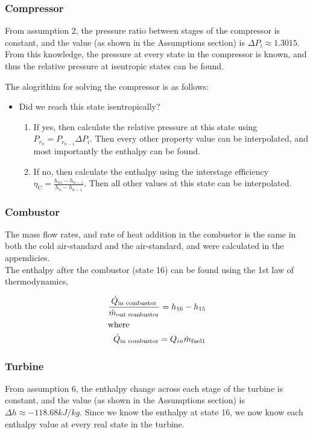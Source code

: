 \documentclass[11pt]{article} %
\begin{document}
\subsubsection*{Compressor}
From assumption 2, the pressure ratio between stages of the compressor is constant, and the value (as shown in the Assumptions section) is $\Delta P_i \approx 1.3015$. From this knowledge, the pressure at every state in the compressor is known, and thus the relative pressure at isentropic states can be found.

\noindent The alogrithim for solving the compressor is as follows: 
\begin{itemize}
\item Did we reach this state isentropically?
\begin{enumerate}
\item If yes, then calculate the relative pressure at this state using $P_{r_n} = P_{r_{n-1}} \Delta P_i$. Then every other property value can be interpolated, and most importantly the enthalpy can be found.
\item If no, then calculate the enthalpy using the interstage efficiency $\eta_{\text{C}} = \frac{ h_{ns} - h_{n-1} }{h_{n} - h_{n-1}}$. Then all other values at this state can be interpolated.
\end{enumerate}
\end{itemize}

\subsubsection*{Combustor}
The mass flow rates, and rate of heat addition in the combustor is the same in both the cold air-standard and the air-standard, and were calculated in the appendicies. \\

\noindent The enthalpy after the combustor (state 16) can be found using the 1st law of thermodynamics,

\begin{align*}
\frac{\dot{Q}_{\text{in combustor}}}{\dot{m}_{\text{out combustor}}} = h_{16} - h_{15} \\ \intertext{where}
\dot{Q}_{\text{in combustor}} = Q_{in}\dot{m}_{\text{fuel1}}
\end{align*}

\subsubsection*{Turbine}
From assumption 6, the enthalpy change across each stage of the turbine is constant, and the value (as shown in the Assumptions section) is $\Delta h \approx -118.68 \si{kJ/kg}.$ Since we know the enthalpy at state 16, we now know each enthalpy value at every real state in the turbine. 
\end{document}
